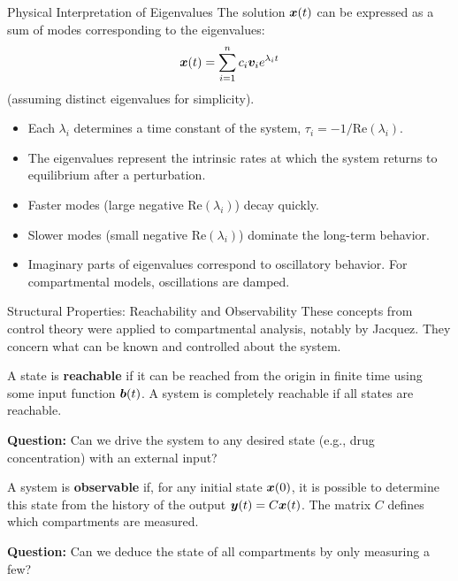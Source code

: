 \documentclass[aspectratio=169]{beamer}\usepackage[]{graphicx}\usepackage[]{xcolor}
\begin{document}
\begin{frame}{Physical Interpretation of Eigenvalues}
    The solution $\bm{x}(t)$ can be expressed as a sum of modes corresponding to the eigenvalues:
    $$ \bm{x}(t) = \sum_{i=1}^n c_i \bm{v}_i e^{\lambda_i t} $$
    (assuming distinct eigenvalues for simplicity).
    \begin{itemize}
        \item Each $\lambda_i$ determines a time constant of the system, $\tau_i = -1/\text{Re}(\lambda_i)$.
        \item The eigenvalues represent the intrinsic rates at which the system returns to equilibrium after a perturbation.
        \item Faster modes (large negative $\text{Re}(\lambda_i)$) decay quickly.
        \item Slower modes (small negative $\text{Re}(\lambda_i)$) dominate the long-term behavior.
        \item Imaginary parts of eigenvalues correspond to oscillatory behavior. For compartmental models, oscillations are damped.
    \end{itemize}
\end{frame}

\begin{frame}{Structural Properties: Reachability and Observability}
    These concepts from control theory were applied to compartmental analysis, notably by Jacquez. They concern what can be known and controlled about the system.

    \begin{definition}[Reachability]
        A state is \textbf{reachable} if it can be reached from the origin in finite time using some input function $\bm{b}(t)$. A system is completely reachable if all states are reachable.
    \end{definition}
    \textbf{Question:} Can we drive the system to any desired state (e.g., drug concentration) with an external input?

    \begin{definition}[Observability]
        A system is \textbf{observable} if, for any initial state $\bm{x}(0)$, it is possible to determine this state from the history of the output $\bm{y}(t) = C\bm{x}(t)$. The matrix $C$ defines which compartments are measured.
    \end{definition}
    \textbf{Question:} Can we deduce the state of all compartments by only measuring a few?
\end{frame}
\end{document}
